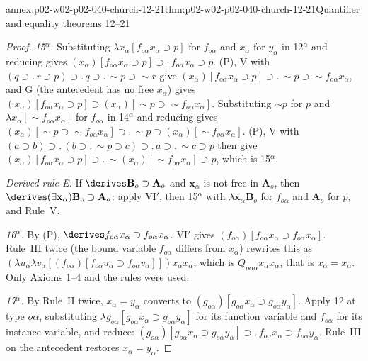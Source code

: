 \begin{annexitem}{annex:p02-w02-p02-040-church-12-21}{thm:p02-w02-p02-040-church-12-21}{Quantifier and equality theorems 12--21}
\begin{proof}
\emph{15\(^\alpha\).}  Substituting \(\lambda x_\alpha[f_{o\alpha}x_\alpha\supset p]\)
for \(f_{o\alpha}\) and \(x_\alpha\) for \(y_\alpha\) in 12\(^\alpha\) and
reducing gives
\((x_\alpha)[f_{o\alpha}x_\alpha\supset p]\supset.\,f_{o\alpha}x_\alpha\supset p\).
(P), V with \((q\supset.\,r\supset p)\supset.\,q\supset.\,\sim p\supset\sim r\)
give \((x_\alpha)[f_{o\alpha}x_\alpha\supset p]\supset.\,\sim p\supset\sim f_{o\alpha}x_\alpha\),
and G (the antecedent has no free \(x_\alpha\)) gives
\((x_\alpha)[f_{o\alpha}x_\alpha\supset p]\supset(x_\alpha)[\sim p\supset\sim f_{o\alpha}x_\alpha]\).
Substituting \(\sim p\) for \(p\) and \(\lambda x_\alpha[\sim f_{o\alpha}x_\alpha]\)
for \(f_{o\alpha}\) in 14\(^\alpha\) and reducing gives
\((x_\alpha)[\sim p\supset\sim f_{o\alpha}x_\alpha]\supset.\,\sim p\supset(x_\alpha)[\sim f_{o\alpha}x_\alpha]\).
(P), V with \((a\supset b)\supset.\,(b\supset.\,\sim p\supset c)\supset.\,a\supset.\,\sim c\supset p\)
then give
\((x_\alpha)[f_{o\alpha}x_\alpha\supset p]\supset.\,\sim(x_\alpha)[\sim f_{o\alpha}x_\alpha]\supset p\),
which is 15\(^\alpha\).

\emph{Derived rule E.}  If \(\derives\mathbf B_o\supset\mathbf A_o\) and
\(\mathbf x_\alpha\) is not free in \(\mathbf A_o\), then
\(\derives(\exists\mathbf x_\alpha)\mathbf B_o\supset\mathbf A_o\): apply VI\('\),
then 15\(^\alpha\) with \(\lambda\mathbf x_\alpha\mathbf B_o\) for
\(f_{o\alpha}\) and \(\mathbf A_o\) for \(p\), and Rule~V.

\emph{16\(^\alpha\).}  By (P), \(\derives f_{o\alpha}x_\alpha\supset f_{o\alpha}x_\alpha\).
VI\('\) gives \((f_{o\alpha})[f_{o\alpha}x_\alpha\supset f_{o\alpha}x_\alpha]\).
Rule~III twice (the bound variable \(f_{o\alpha}\) differs from
\(x_\alpha\)) rewrites this as
\((\lambda u_\alpha\lambda v_\alpha[(f_{o\alpha})[f_{o\alpha}u_\alpha\supset f_{o\alpha}v_\alpha]])x_\alpha x_\alpha\),
which is \(Q_{o\alpha\alpha}x_\alpha x_\alpha\), that is \(x_\alpha=x_\alpha\).
Only Axioms 1--4 and the rules were used.

\emph{17\(^\alpha\).}  By Rule~II twice, \(x_\alpha=y_\alpha\) converts to
\((g_{o\alpha})[g_{o\alpha}x_\alpha\supset g_{o\alpha}y_\alpha]\).  Apply
12 at type \(o\alpha\), substituting
\(\lambda g_{o\alpha}[g_{o\alpha}x_\alpha\supset g_{o\alpha}y_\alpha]\) for its
function variable and \(f_{o\alpha}\) for its instance variable, and reduce:
\((g_{o\alpha})[g_{o\alpha}x_\alpha\supset g_{o\alpha}y_\alpha]\supset.\,f_{o\alpha}x_\alpha\supset f_{o\alpha}y_\alpha\).
Rule~III on the antecedent restores \(x_\alpha=y_\alpha\).


\end{proof}
\end{annexitem}
